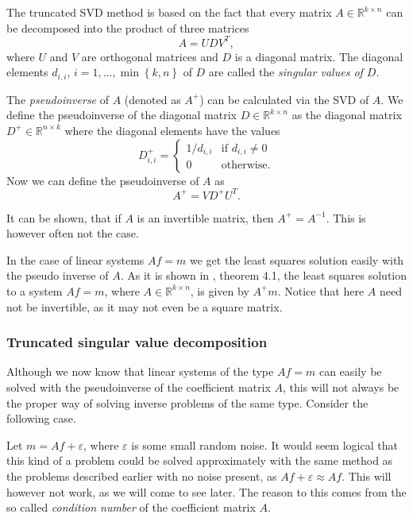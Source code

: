 \documentclass[12pt,a4]{article}
\newcommand{\R}{{\mathbb R}}
\newcommand{\eps}{\varepsilon}
\begin{document}
The truncated SVD method is based on the fact that every matrix $A \in \R^{k \times n}$ can be decomposed into the product of three matrices
\begin{equation}
A = U D V^T,
\end{equation}
where $U$ and $V$ are orthogonal matrices and $D$ is a diagonal matrix. The diagonal elements $d_{i,i}$, $i = 1, \ldots , \min \left\{ k,n \right\}$ of $D$ are called the \emph{singular values of $D$}.

The \emph{pseudoinverse} of $A$ (denoted as $A^+$) can be calculated via the SVD of $A$. We define the pseudoinverse of the diagonal matrix $D \in \R^{k \times n}$ as the diagonal matrix $D^+ \in \R^{n \times k}$ where the diagonal elements have the values
\begin{equation}
D^+_{i,i} =
\begin{cases}
    1 / d_{i,i} & \text{if }d_{i,i} \neq 0 \\
    0           & \text{otherwise}.
\end{cases}
\end{equation}
Now we can define the pseudoinverse of $A$ as 
\begin{equation}\label{pseudo}
A^+ = V D^+ U^T .
\end{equation}

It can be shown, that if $A$ is an invertible matrix, then $A^+ = A^{-1}$. This is however often not the case.

In the case of linear systems $Af = m$ we get the least squares solution easily with the pseudo inverse of $A$. As it is shown in \cite{samu}, theorem 4.1, the least squares solution to a system $Af = m$, where $A \in \R^{k \times n}$, is given by $A^+ m$. Notice that here $A$ need not be invertible, as it may not even be a square matrix.

\subsubsection{Truncated singular value decomposition}

Although we now know that linear systems of the type $Af = m$ can easily be solved with the pseudoinverse of the coefficient matrix $A$, this will not always be the proper way of solving inverse problems of the same type. Consider the following case.

Let $m = A f + \eps$, where $\eps$ is some small random noise. It would seem logical that this kind of a problem could be solved approximately with the same method as the problems described earlier with no noise present, as $Af + \eps \approx Af$. This will however not work, as we will come to see later. The reason to this comes from the so called \emph{condition number} of the coefficient matrix $A$.
\end{document}
